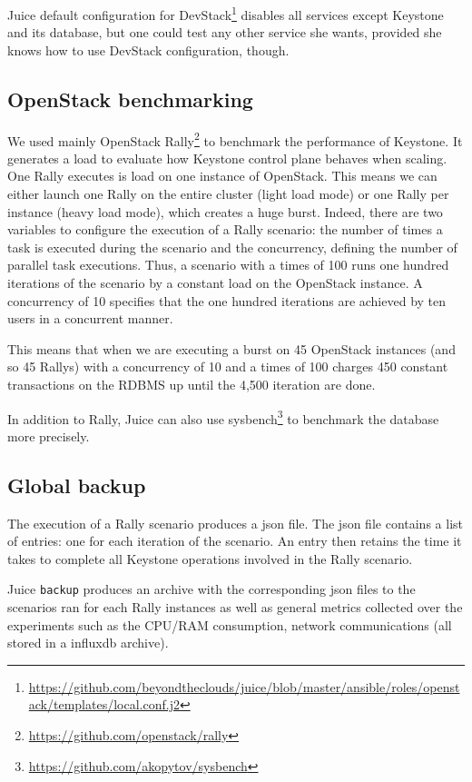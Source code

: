 Juice default configuration for DevStack\footnote{\url{https://github.com/beyondtheclouds/juice/blob/master/ansible/roles/openstack/templates/local.conf.j2}} disables all services except Keystone and its database, but one could test any other service she wants, provided she knows how to use DevStack configuration, though.


\subsection{OpenStack benchmarking}
\label{subsec:benchmarking}

We used mainly OpenStack Rally\footnote{\url{https://github.com/openstack/rally}} to benchmark the performance of Keystone. It generates a load to evaluate how Keystone control plane behaves when scaling.
One Rally executes is load on one instance of OpenStack. This means we can either launch one Rally on the entire cluster (light load mode) or one Rally per instance (heavy load mode), which creates a huge burst. Indeed, there are two variables to configure the execution of a Rally scenario: the number of times a task is executed during the scenario and the concurrency, defining the number of parallel task executions. Thus, a scenario with a times of 100 runs one hundred iterations of the scenario by a constant load on the OpenStack instance. A concurrency of 10 specifies that the one hundred iterations are achieved by ten users in a concurrent manner.

This means that when we are executing a burst on 45 OpenStack instances (and so 45 Rallys) with a concurrency of 10 and a times of 100 charges 450 constant transactions on the RDBMS up until the 4,500 iteration are done.

In addition to Rally, Juice can also use sysbench\footnote{\url{https://github.com/akopytov/sysbench}} to benchmark the database more precisely.



\subsection{Global backup}

The execution of a Rally scenario produces a json file. The json file contains a list of entries: one for each iteration of the scenario. An entry then retains the time it takes to complete all Keystone operations involved in the Rally scenario.

Juice \verb+backup+ produces an archive with the corresponding json files to the scenarios ran for each Rally instances as well as general metrics collected over the experiments such as the CPU/RAM consumption, network communications (all stored in a influxdb archive).

